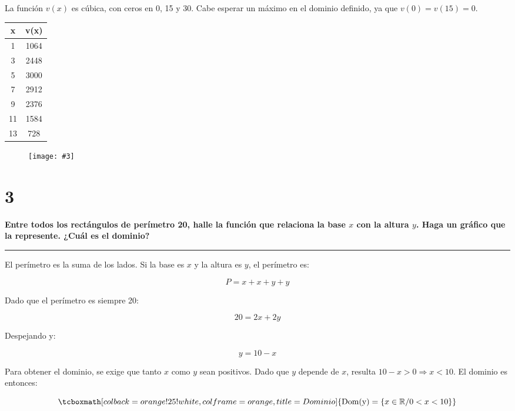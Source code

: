 \documentclass{article}
\newcommand{\hresult}[2]{\tcboxmath[colback=orange!25!white,colframe=orange, title=#1] {#2} }
\newcommand{\figurex}[4]{\begin{figure}[ht] \caption{#1} \texttt{[image: \#3]} \centering \label{#4}\end{figure}}
\newcommand{\sectionx}[1]{\section*{#1}\label{sec:#1}\addcontentsline{toc}{section}{\nameref{sec:#1}}}
\begin{document}
La función $v(x)$ es cúbica, con ceros en 0, 15 y 30. Cabe esperar un máximo en el dominio definido, ya que $v(0) = v(15) = 0$.

\begin{center}
\begin{tabular}{||c c||} 
 \hline
 x & v(x) \\ [0.5ex] 
 \hline\hline
 1 & 1064 \\ 
 \hline
 3 & 2448 \\
 \hline
 5 & 3000 \\
 \hline
 7 & 2912 \\
 \hline
 9 & 2376 \\
 \hline
 11 & 1584 \\
 \hline
 13 & 728 \\ [1ex] 
 \hline
\end{tabular}
\end{center}

\newpage

\figurex{}{0.6}{../img/guide_01/ex_02c.png}{fig:2c}

\sectionx{3}

\textbf{Entre todos los rectángulos de perímetro 20, halle la función que relaciona la base $x$ con la altura $y$. Haga un gráfico que la represente. ¿Cuál es el dominio?}

\vspace{1em}
\hrule
\vspace{1em}

El perímetro es la suma de los lados. Si la base es $x$ y la altura es $y$, el perímetro es:

\begin{equation}
P = x + x + y + y
\end{equation}

Dado que el perímetro es siempre 20:

\begin{equation}
20 = 2x + 2y
\end{equation}

Despejando y:

\begin{equation}
y = 10 - x
\end{equation}

Para obtener el dominio, se exige que tanto $x$ como $y$ sean positivos. Dado que $y$ depende de $x$, resulta $10 - x > 0 \Rightarrow x < 10$. El dominio es entonces:

\begin{equation}
\hresult{Dominio}{ \mathop{\text{Dom(y)}} = \{ x \in \mathbb{R} / 0 < x < 10 \} }
\end{equation}
\end{document}
